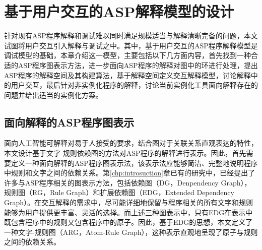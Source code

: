 \chapter{基于用户交互的ASP解释模型的设计}
针对现有ASP程序解释和调试难以同时满足规模适当与解释清晰完备的问题，本文试图将用户交互引入解释与调试之中。其中，基于用户交互的ASP程序解释模型是调试模型的基础，本章介绍这一模型，主要包括以下几方面内容，首先找到一种合适的ASP程序图表示方法，进一步面向ASP程序的解释对图中的环进行处理，提出ASP程序的解释空间及其构建算法，基于解释空间定义交互解释模型，讨论解释中的用户交互，最后针对非实例化程序的解释，讨论当前实例化工具面向解释存在的问题并给出适当的实例化方案。
\section{面向解释的ASP程序图表示}
面向人工智能可解释对易于人接受的要求，结合图对于关联关系直观表达的特性，本文设计基于文字-规则依赖图的方法对ASP程序的解释进行表示。因此，首先需要定义一种面向解释的ASP程序图表示法，该表示法应能够简洁、完整地说明程序中规则和文字之间的依赖关系。第\ref{chp:introsuction}章已有的研究中，已经提出了许多与ASP程序相关的图表示方法，包括依赖图（DG，Denpendency Graph）\cite{apt1994logic}，规则图（RG，Rule Graph）\cite{dimopoulos1996graph}和扩展依赖图（EDG，Extended Dependency Graph）\cite{brignoli2014characterizing}。在交互解释的需求中，尽可能详细地保留与程序相关的所有文字和规则能够为用户提供更丰富、灵活的选择。而上述三种图表示中，只有EDG在表示中既包含程序中的规则又包含程序中的原子。因此，基于EDG的思想，本文定义了一种文字-规则图（ARG，Atom-Rule Graph），这种表示直观地呈现了原子与规则之间的依赖关系。

